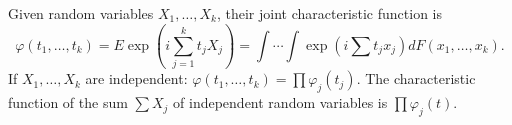 Given random variables $X_1, \ldots, X_k$, their joint characteristic function is
$$\varphi(t_1, \ldots, t_k) = E \exp\left(i \sum_{j=1}^{k} t_j X_j\right) = \int \cdots \int \exp\left(i \sum t_j x_j\right) dF(x_1, \ldots, x_k).$$
If $X_1, \ldots, X_k$ are independent: $\varphi(t_1, \ldots, t_k) = \prod \varphi_j(t_j)$. The characteristic function of the sum $\sum X_j$ of independent random variables is $\prod \varphi_j(t)$.
